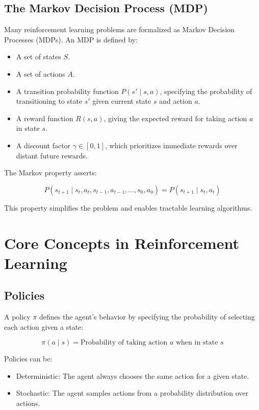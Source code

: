 \documentclass[openany]{book}
\begin{document}
\subsection{The Markov Decision Process (MDP)}

Many reinforcement learning problems are formalized as Markov Decision Processes
(MDPs). An MDP is defined by:

\begin{itemize}
    \item A set of states \( S \).
    \item A set of actions \( A \).
    \item A transition probability function \( P(s' \mid s, a) \), specifying 
    the probability of transitioning to state \( s' \) given current state 
    \( s \) and action \( a \).
    \item A reward function \( R(s,a) \), giving the expected reward for taking 
    action \( a \) in state \( s \).
    \item A discount factor \( \gamma \in [0,1] \), which prioritizes immediate 
    rewards over distant future rewards.
\end{itemize}

The Markov property asserts:

\[
P(s_{t+1} \mid s_t, a_t, s_{t-1}, a_{t-1}, \dots, s_0, a_0) = P(s_{t+1} 
\mid s_t, a_t)
\]

This property simplifies the problem and enables tractable learning algorithms.

\section{Core Concepts in Reinforcement Learning}

\subsection{Policies}

A policy \( \pi \) defines the agent's behavior by specifying the probability of 
selecting each action given a state:

\[
\pi(a \mid s) = \text{Probability of taking action } a \text{ when in state } s
\]

Policies can be:

\begin{itemize}
    \item Deterministic: The agent always chooses the same action for a given 
    state.
    \item Stochastic: The agent samples actions from a probability distribution 
    over actions.
\end{itemize}
\end{document}
